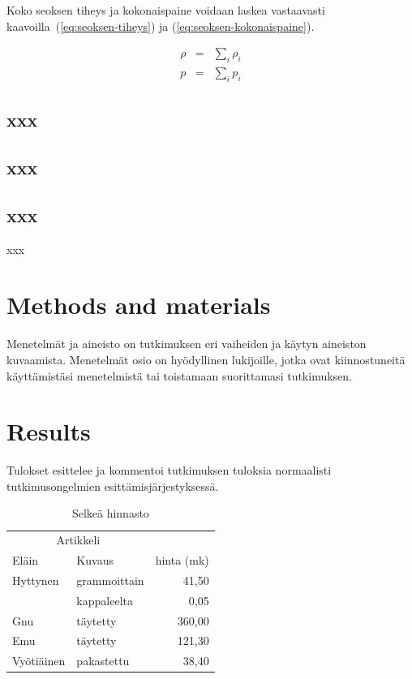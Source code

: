 \documentclass[final]{thesis} %
\begin{document}
Koko seoksen tiheys ja kokonaispaine voidaan laskea vastaavasti kaavoilla~(\ref{eq:seoksen-tiheys}) ja (\ref{eq:seoksen-kokonaispaine}).

\begin{eqnarray}
   \rho & = & \sum_i \rho_i \label{eq:seoksen-tiheys} \\
   p & = & \sum_i p_i \label{eq:seoksen-kokonaispaine}
\end{eqnarray}

\subsection{xxx}
\label{sec:xxx2}

\subsection{xxx}
\label{sec:xxx3}

\subsection{xxx}
\label{sec:xxx4}

xxx

\section{Methods and materials}
\label{sec:methods-and-materials}

Menetelmät ja aineisto on tutkimuksen eri vaiheiden ja käytyn aineiston kuvaamista. Menetelmät osio on hyödyllinen lukijoille, jotka ovat kiinnostuneitä käyttämistäsi menetelmistä tai toistamaan suorittamasi tutkimuksen.

\lipsum[3-5]

\section{Results}
\label{sec:results}

Tulokset esittelee ja kommentoi tutkimuksen tuloksia normaalisti tutkimusongelmien esittämisjärjestyksessä.

\begin{table}[h]
   \centering
   \caption{Selkeä hinnasto}
   \begin{tabular}{llr} \toprule
      \multicolumn{2}{c}{Artikkeli} \\ \cmidrule(r){1-2}
      Eläin    & Kuvaus       & hinta (mk) \\ \midrule
      Hyttynen & grammoittain &  41,50 \\
               & kappaleelta  &   0,05 \\
							
      Gnu      & täytetty     & 360,00 \\
      Emu      & täytetty     & 121,30 \\
      Vyötiäinen & pakastettu &  38,40 \\ \bottomrule
   \end{tabular}
\end{table}
\end{document}
